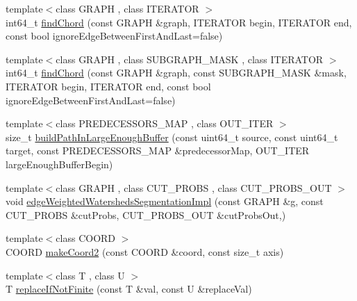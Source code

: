 \begin{DoxyCompactItemize}
{\footnotesize template$<$class G\+R\+A\+PH , class I\+T\+E\+R\+A\+T\+OR $>$ }\\int64\+\_\+t \hyperlink{namespacenifty_1_1graph_a5efcd6025d7a1aa6ec3e9826f05d73f1}{find\+Chord} (const G\+R\+A\+PH \&graph, I\+T\+E\+R\+A\+T\+OR begin, I\+T\+E\+R\+A\+T\+OR end, const bool ignore\+Edge\+Between\+First\+And\+Last=false)
\item 
{\footnotesize template$<$class G\+R\+A\+PH , class S\+U\+B\+G\+R\+A\+P\+H\+\_\+\+M\+A\+SK , class I\+T\+E\+R\+A\+T\+OR $>$ }\\int64\+\_\+t \hyperlink{namespacenifty_1_1graph_aa3515c9d13aba223fd3f7771db67af53}{find\+Chord} (const G\+R\+A\+PH \&graph, const S\+U\+B\+G\+R\+A\+P\+H\+\_\+\+M\+A\+SK \&mask, I\+T\+E\+R\+A\+T\+OR begin, I\+T\+E\+R\+A\+T\+OR end, const bool ignore\+Edge\+Between\+First\+And\+Last=false)
\item 
{\footnotesize template$<$class P\+R\+E\+D\+E\+C\+E\+S\+S\+O\+R\+S\+\_\+\+M\+AP , class O\+U\+T\+\_\+\+I\+T\+ER $>$ }\\size\+\_\+t \hyperlink{namespacenifty_1_1graph_ad5fff1c63a572469a352e1645f9d3d0c}{build\+Path\+In\+Large\+Enough\+Buffer} (const uint64\+\_\+t source, const uint64\+\_\+t target, const P\+R\+E\+D\+E\+C\+E\+S\+S\+O\+R\+S\+\_\+\+M\+AP \&predecessor\+Map, O\+U\+T\+\_\+\+I\+T\+ER large\+Enough\+Buffer\+Begin)
\item 
{\footnotesize template$<$class G\+R\+A\+PH , class C\+U\+T\+\_\+\+P\+R\+O\+BS , class C\+U\+T\+\_\+\+P\+R\+O\+B\+S\+\_\+\+O\+UT $>$ }\\void \hyperlink{namespacenifty_1_1graph_a694051530c47e632c37d39ba5d8b0f04}{edge\+Weighted\+Watersheds\+Segmentation\+Impl} (const G\+R\+A\+PH \&g, const C\+U\+T\+\_\+\+P\+R\+O\+BS \&cut\+Probs, C\+U\+T\+\_\+\+P\+R\+O\+B\+S\+\_\+\+O\+UT \&cut\+Probs\+Out,)
\item 
{\footnotesize template$<$class C\+O\+O\+RD $>$ }\\C\+O\+O\+RD \hyperlink{namespacenifty_1_1graph_aca62625e3c61b810e2f6cda338de2c26}{make\+Coord2} (const C\+O\+O\+RD \&coord, const size\+\_\+t axis)
\item 
{\footnotesize template$<$class T , class U $>$ }\\T \hyperlink{namespacenifty_1_1graph_a511023b23336eb0591905cc2034b00a5}{replace\+If\+Not\+Finite} (const T \&val, const U \&replace\+Val)
\item 

\end{DoxyCompactItemize}

